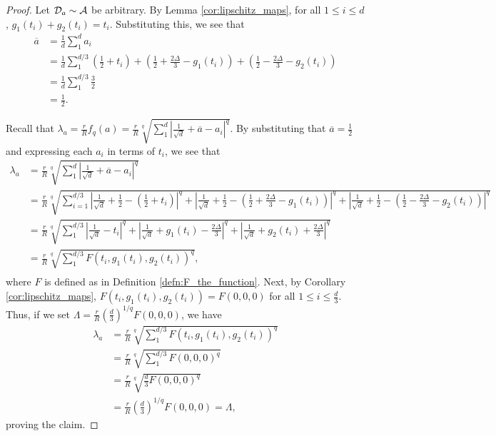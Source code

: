 \begin{proof}
Let ${\mathcal D}_a \sim \mathcal{A}$ be arbitrary. By Lemma \ref{cor:lipschitz_maps}, for all $1 \leq i \leq d$, $g_1(t_i) + g_2(t_i) = t_i$. Substituting this, we see that 
\begin{equation*}
\begin{split}
\overline{a} &= \frac{1}{d}\sum_1^d a_i \\
&= \frac{1}{d}\sum_1^{d/3} (\frac{1}{2} + t_i) + (\frac{1}{2} + \frac{2\Delta}{3} - g_1(t_i)) + (\frac{1}{2} - \frac{2\Delta}{3} - g_2(t_i)) \\
&= \frac{1}{d}\sum_1^{d/3} \frac{3}{2} \\
&= \frac{1}{2}.
\end{split}
\end{equation*}

Recall that $\lambda_a = \frac{r}{R}f_q(a) = \frac{r}{R}\sqrt[q]{\sum_1^d |\frac{1}{\sqrt{d}} + \overline{a} - a_i|^q}$. By substituting that $\overline{a} = \frac{1}{2}$ and expressing each $a_i$ in terms of $t_i$, we see that 
\begin{equation*}
\begin{split}
\lambda_a &=  \frac{r}{R}\sqrt[q]{\sum_1^d |\frac{1}{\sqrt{d}} + \overline{a} - a_i|^q}\\
&= \frac{r}{R}\sqrt[q]{\sum_{i=1}^{d/3} \left|\frac{1}{\sqrt{d}} + \frac{1}{2} - (\frac{1}{2} + t_i)\right|^q + \left|\frac{1}{\sqrt{d}} + \frac{1}{2} - \left(\frac{1}{2} + \frac{2\Delta}{3} - g_1(t_i)\right)\right|^q +  \left|\frac{1}{\sqrt{d}} + \frac{1}{2} - \left(\frac{1}{2} - \frac{2\Delta}{3} - g_2(t_i)\right)\right|^q} \\
 &= \frac{r}{R}\sqrt[q]{\sum_1^{d/3} \left|\frac{1}{\sqrt{d}} - t_i\right|^q + \left|\frac{1}{\sqrt{d}} + g_1(t_i) - \frac{2\Delta}{3}\right|^q + \left|\frac{1}{\sqrt{d}} + g_2(t_i) + \frac{2\Delta}{3}\right|^q} \\
&= \frac{r}{R}\sqrt[q]{\sum_1^{d/3}F(t_i, g_1(t_i), g_2(t_i))^q}, \\
\end{split}
\end{equation*}
where $F$ is defined as in Definition \ref{defn:F_the_function}. Next, by Corollary \ref{cor:lipschitz_maps}, $F(t_i, g_1(t_i), g_2(t_i)) = F(0,0,0)$ for all $1 \leq i \leq \frac{d}{3}$. Thus, if we set $\Lambda = \frac{r}{R}(\frac{d}{3})^{1/q}F(0,0,0)$, we have 
\begin{equation*}
\begin{split}
\lambda_a &= \frac{r}{R}\sqrt[q]{\sum_1^{d/3} F(t_i, g_1(t_i), g_2(t_i))^q} \\
&= \frac{r}{R}\sqrt[q]{\sum_1^{d/3}F(0,0,0)^q} \\
&= \frac{r}{R}\sqrt[q]{\frac{d}{3}F(0,0,0)^q} \\
&=  \frac{r}{R}(\frac{d}{3})^{1/q}F(0,0,0) = \Lambda,
\end{split}
\end{equation*}
proving the claim.
\end{proof}

